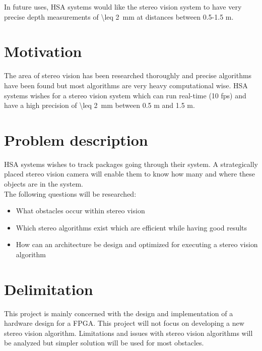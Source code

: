 In future uses, HSA systems would like the stereo vision system to have very precise depth measurements of \SI{\leq 2}{\milli\meter} at distances between 0.5-1.5 m.

\section{Motivation}\label{sec:intromotiv}
The area of stereo vision has been researched thoroughly and precise algorithms have been found but most algorithms are very heavy computational wise. HSA systems wishes for a stereo vision system which can run real-time (10 fps) and have a high precision of \SI{\leq 2}{\milli\meter} between 0.5 m and 1.5 m.

\section{Problem description}
HSA systems wishes to track packages going through their system. A strategically placed stereo vision camera will enable them to know how many and where these objects are in the system. \\
The following questions will be researched:
\begin{itemize}
  \item What obstacles occur within stereo vision
  \item Which stereo algorithms exist which are efficient while having good results
  \item How can an architecture be design and optimized for executing a stereo vision algorithm
\end{itemize}

\section{Delimitation}
This project is mainly concerned with the design and implementation of a hardware design for a FPGA. This project will not focus on developing a new stereo vision algorithm. Limitations and issues with stereo vision algorithms will be analyzed but simpler solution will be used for most obstacles.

